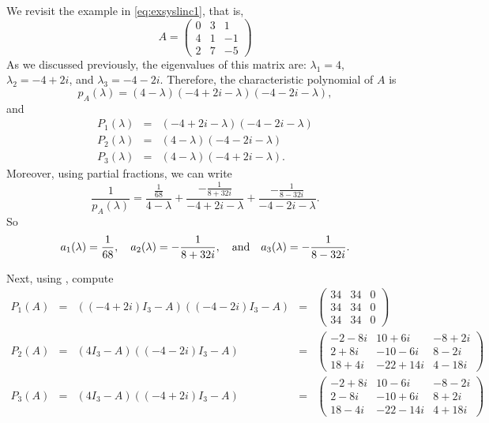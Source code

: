 \documentclass{ximera}
\begin{document}
We revisit the example in \eqref{eq:exsyslinc1}, that is, 
\[
A = \left(\begin{array}{rrr}
     0  &  3  &  1\\
     4  &  1  & -1\\
     2  &  7  & -5
\end{array}\right)
\]
As we discussed previously, the eigenvalues of this matrix are:
$\lambda_1=4$, $\lambda_2=-4+2i$, and $\lambda_3=-4-2i$.
Therefore, the characteristic 
polynomial of $A$ is
\[
p_A(\lambda) = (4-\lambda)(-4+2i-\lambda)(-4-2i-\lambda),
\]
and
\begin{eqnarray*}
P_1(\lambda) & = & (-4+2i-\lambda)(-4-2i-\lambda) \\
P_2(\lambda)& = & (4-\lambda)(-4-2i-\lambda)\\  
P_3(\lambda) & = & (4-\lambda)(-4+2i-\lambda).
\end{eqnarray*}
Moreover, using partial fractions, 
we can write
\[
\frac{1}{p_A(\lambda)} = \frac{\frac{1}{68}}{4-\lambda} + 
\frac{-\frac{1}{8+32i}}{-4+2i-\lambda}
+ \frac{-\frac{1}{8-32i}}{-4-2i-\lambda}.
\]
So
\[
a_1(\lambda)=\frac{1}{68}, \quad a_2(\lambda)=-\frac{1}{8+32i},
 \quad\mbox{and}\quad a_3(\lambda)=-\frac{1}{8-32i}.
\]

Next, using \Matlabp, compute
\[
\begin{array}{rcccl}
P_1(A) & = & ((-4+2i)I_3-A)((-4-2i)I_3-A) & = & 
\left(\begin{array}{rrr}  
     34    &       34    &        0 \\     
     34    &       34    &        0 \\     
     34    &       34    &        0      
\end{array}\right) \\
P_2(A) & = & (4I_3-A)((-4-2i)I_3-A) & = &  
\left(\begin{array}{rrr}
     -2  - 8i     &   10  +  6i  &  -8  +  2i \\     
      2  + 8i     &  -10  -  6i  &   8  -  2i \\     
     18  + 4i     &  -22  + 14i  &   4  - 18i       
\end{array}\right) \\
P_3(A) & = & (4I_3-A)((-4+2i)I_3-A) & = & 
\left(\begin{array}{rrr}
     -2  + 8i     &   10  -  6i  &  -8  -  2i \\      
      2  - 8i     &  -10  +  6i  &   8  +  2i \\   
     18  - 4i     &  -22  - 14i  &   4  + 18i    
\end{array}\right)
\end{array}
\]
\end{document}
